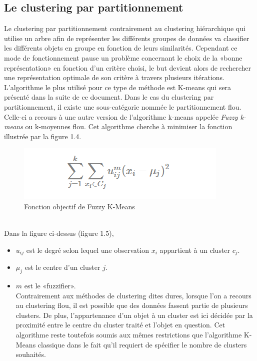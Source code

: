 \documentclass[memoire.tex]{subfiles}
\begin{document}
\newpage
\subsection{Le clustering par partitionnement}
Le clustering par partitionnement contrairement au clustering hiérarchique qui utilise un arbre afin de représenter les différents groupes de données va classifier les différents objets en groupe en fonction de leurs similarités. Cependant ce mode de fonctionnement pause un problème concernant le choix de la «bonne représentation» en fonction d'un critère choisi, le but devient alors de rechercher une représentation optimale de son critère à travers plusieurs itérations.\cite{ref8} L'algorithme le plus utilisé pour ce type de méthode est K-means qui sera présenté dans la suite de ce document. Dans le cas du clustering par partitionnement, il existe une sous-catégorie nommée le partitionnement flou. Celle-ci a recours à une autre version de l'algorithme k-means appelée \textit{Fuzzy k-means} ou k-moyennes flou. Cet algorithme cherche à minimiser la fonction illustrée par la figure 1.4.
	\begin{figure}[h!]
		\centerline{\includegraphics[scale=0.8]{img/fuzzy_algo.png}}
		\caption{Fonction objectif de Fuzzy K-Means}
	\end{figure}\\
Dans la figure ci-dessus (figure 1.5), \begin{itemize}
\item $u_{ij}$ est le degré selon lequel une observation $x_{i}$ appartient à un cluster $c_{j}$.
\item $\mu_j$ est le centre d'un cluster $j$.
\item $m$ est le «fuzzifier».\\
Contrairement aux méthodes de clustering dites dures, lorsque l'on a recours au clustering flou, il est possible que des données fassent partie de plusieurs clusters. De plus, l'appartenance d'un objet à un cluster est ici décidée par la proximité entre le centre du cluster traité et l'objet en question. \cite{ref13} Cet algorithme reste toutefois soumis aux mêmes restrictions que l'algorithme K-Means classique dans le fait qu'il requiert de spécifier le nombre de clusters souhaités.
\end{itemize}
\end{document}
